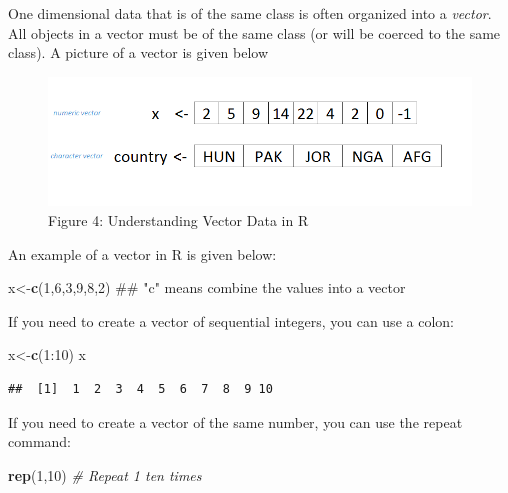 \documentclass[]{book}
\newenvironment{Shaded}{\begin{snugshade}}{\end{snugshade}}
\newcommand{\KeywordTok}[1]{\textcolor[rgb]{0.13,0.29,0.53}{\textbf{{#1}}}}
\newcommand{\DecValTok}[1]{\textcolor[rgb]{0.00,0.00,0.81}{{#1}}}
\newcommand{\CommentTok}[1]{\textcolor[rgb]{0.56,0.35,0.01}{\textit{{#1}}}}
\newcommand{\NormalTok}[1]{{#1}}
\begin{document}
One dimensional data that is of the same class is often organized into a
\emph{vector}. All objects in a vector must be of the same class (or
will be coerced to the same class). A picture of a vector is given below

\begin{figure}[htbp]
\centering
\includegraphics{vector.PNG}
\caption{Figure 4: Understanding Vector Data in R}
\end{figure}

An example of a vector in R is given below:

\begin{Shaded}
\begin{Highlighting}[]
\NormalTok{x<-}\KeywordTok{c}\NormalTok{(}\DecValTok{1}\NormalTok{,}\DecValTok{6}\NormalTok{,}\DecValTok{3}\NormalTok{,}\DecValTok{9}\NormalTok{,}\DecValTok{8}\NormalTok{,}\DecValTok{2}\NormalTok{)    ## "c" means combine the values into a vector}
\end{Highlighting}
\end{Shaded}

If you need to create a vector of sequential integers, you can use a
colon:

\begin{Shaded}
\begin{Highlighting}[]
\NormalTok{x<-}\KeywordTok{c}\NormalTok{(}\DecValTok{1}\NormalTok{:}\DecValTok{10}\NormalTok{)}
\NormalTok{x}
\end{Highlighting}
\end{Shaded}

\begin{verbatim}
##  [1]  1  2  3  4  5  6  7  8  9 10
\end{verbatim}

If you need to create a vector of the same number, you can use the
repeat command:

\begin{Shaded}
\begin{Highlighting}[]
\KeywordTok{rep}\NormalTok{(}\DecValTok{1}\NormalTok{,}\DecValTok{10}\NormalTok{)  }\CommentTok{# Repeat 1 ten times}
\end{Highlighting}
\end{Shaded}
\end{document}
